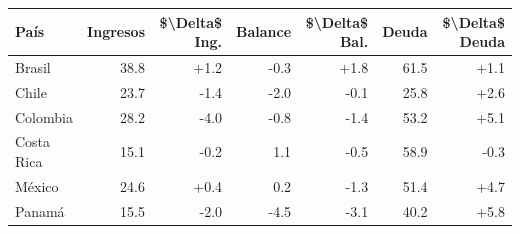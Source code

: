 
\begin{tabular}{lrrrrrr}
\toprule
País & Ingresos & \$\textbackslash{}Delta\$ Ing. & Balance & \$\textbackslash{}Delta\$ Bal. & Deuda & \$\textbackslash{}Delta\$ Deuda\\
\midrule
Brasil & 38.8 & +1.2 & -0.3 & +1.8 & 61.5 & +1.1\\
Chile & 23.7 & -1.4 & -2.0 & -0.1 & 25.8 & +2.6\\
Colombia & 28.2 & -4.0 & -0.8 & -1.4 & 53.2 & +5.1\\
Costa Rica & 15.1 & -0.2 & 1.1 & -0.5 & 58.9 & -0.3\\
México & 24.6 & +0.4 & 0.2 & -1.3 & 51.4 & +4.7\\
Panamá & 15.5 & -2.0 & -4.5 & -3.1 & 40.2 & +5.8\\
\bottomrule
\end{tabular}